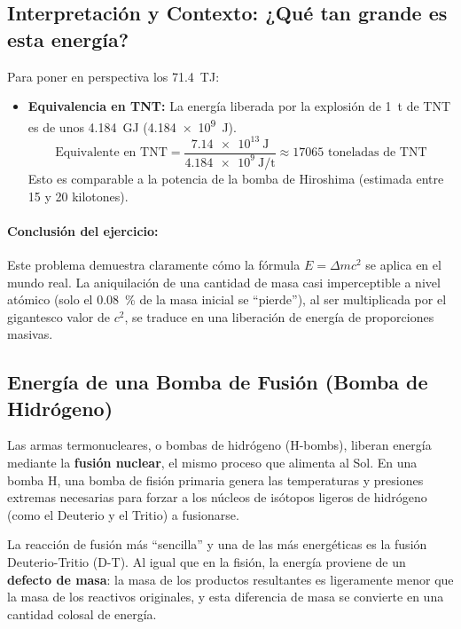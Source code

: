 \documentclass[11pt,a4paper]{book}
\begin{document}
\subsection*{Interpretación y Contexto: ¿Qué tan grande es esta energía?}
Para poner en perspectiva los \SI{71.4}{\tera\joule}:
\begin{itemize}
    \item \textbf{Equivalencia en TNT:} La energía liberada por la explosión de \SI{1}{\tonne} de TNT es de unos \SI{4.184}{\giga\joule} (\SI{4.184e9}{\joule}).
    \[ \text{Equivalente en TNT} = \frac{\SI{7.14e13}{\joule}}{\SI{4.184e9}{\joule\per\tonne}} \approx \num{17065} \text{ toneladas de TNT} \]
    Esto es comparable a la potencia de la bomba de Hiroshima (estimada entre 15 y 20 kilotones).
\end{itemize}

\paragraph{Conclusión del ejercicio:} Este problema demuestra claramente cómo la fórmula $E = \Delta m c^2$ se aplica en el mundo real. La aniquilación de una cantidad de masa casi imperceptible a nivel atómico (solo el \SI{0.08}{\percent} de la masa inicial se ``pierde''), al ser multiplicada por el gigantesco valor de $c^2$, se traduce en una liberación de energía de proporciones masivas.



\subsection{Energía de una Bomba de Fusión (Bomba de Hidrógeno)}

Las armas termonucleares, o bombas de hidrógeno (H-bombs), liberan energía mediante la \textbf{fusión nuclear}, el mismo proceso que alimenta al Sol. En una bomba H, una bomba de fisión primaria genera las temperaturas y presiones extremas necesarias para forzar a los núcleos de isótopos ligeros de hidrógeno (como el Deuterio y el Tritio) a fusionarse.

La reacción de fusión más ``sencilla'' y una de las más energéticas es la fusión Deuterio-Tritio (D-T). Al igual que en la fisión, la energía proviene de un \textbf{defecto de masa}: la masa de los productos resultantes es ligeramente menor que la masa de los reactivos originales, y esta diferencia de masa se convierte en una cantidad colosal de energía.
\end{document}
